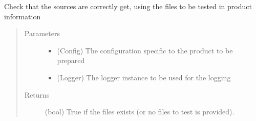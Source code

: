 \documentclass[a4paper,10pt,english]{sphinxmanual}
\begin{document}
\begin{fulllineitems}
\label{\detokenize{apidoc_commands/commands:commands.source.check_sources}}
Check that the sources are correctly get, 
using the files to be tested in product information
\begin{quote}\begin{description}
\item[{Parameters}] \leavevmode\begin{itemize}
\item {} 
 \textendash{} (Config)
The configuration specific to the product to be prepared

\item {} 
 \textendash{} (Logger) 
The logger instance to be used for the logging

\end{itemize}

\item[{Returns}] \leavevmode
(bool) 
True if the files exists (or no files to test is provided).

\end{description}\end{quote}

\end{fulllineitems}

\end{document}
